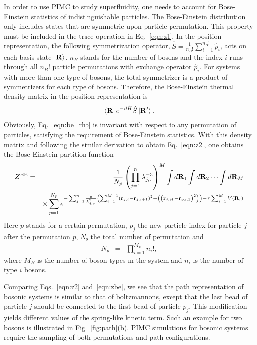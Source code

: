 \documentclass[12pt]{iopart}
\begin{document}
In order to use PIMC to study superfluidity, one needs to account for Bose-Einstein statistics of indistinguishable particles. 
The Bose-Einstein distribution only includes states that are symmetric upon particle permutation.
This property must be included in the trace operation in Eq.~\ref{eqn:z1}. 
In the position representation, the following symmetrization operator, $\hat{S}=\frac{1}{n_{B}!}\sum_{i=1}^{n_{B}!}\hat{p}_i$, acts on
each basis state $\left|{\bf R} \right>$. 
$n_{B}$ stands for the number of bosons and the index $i$ runs through all $n_B!$ particle permutations with exchange operator
$\hat{p}_i$. 
For systems with more than one type of bosons, 
the total symmetrizer is a product of symmetrizers for each type of bosons. 
Therefore, the Bose-Einstein thermal density matrix in the position representation is
\begin{eqnarray}
\left< {\bf R} \right| e^{ -\beta\hat{H} }\hat{S}\left| {\bf R'}\right>. \label{eqn:be_rho}
\end{eqnarray}
Obviously, Eq.~\ref{eqn:be_rho} is invariant with respect to any permutation of particles, satisfying the requirement of Bose-Einstein statistics. With this density matrix and following the similar derivation to obtain Eq.~\ref{eqn:z2}, one obtains the Bose-Einstein partition function
\begin{eqnarray}
Z^{\rm BE}&=&\frac{1}{N_{p}}\left(\prod_{j=1}^n \lambda_{j,\tau}^{-3} \right)^M \int d {\bf R}_1\int d {\bf R}_2\cdots\int d {\bf R}_M \nonumber\\
&&\times \sum_{p=1}^{N_p} e^{ -\sum_{j=1}^n \frac{\pi}{\lambda_{j,\tau}^2} \left( \sum_{i=1}^{M-1}  \left( {\bf r}_{j,i}- {\bf r}_{j,i+1}\right)^2 + \left( \left( {\bf r}_{j,M}- {\bf r}_{p_j,1}\right)^2 \right) \right) -\tau \sum_{i=1}^MV\left( {\bf R}_i \right)}  \label{eqn:zbe}
\end{eqnarray}
Here $p$ stands for a certain permutation, $p_j$ the new particle index for particle $j$ after the permutation $p$, $N_p$ the total number of permutation and
\begin{eqnarray}
N_p&=&\prod_{i=1}^{M_B} n_i!,
\end{eqnarray}
where $M_B$ is the number of boson types in the system and $n_i$ is the number of type $i$ bosons.

Comparing Eqs.~\ref{eqn:z2} and~\ref{eqn:zbe}, we see that the path representation of bosonic systems is similar to that of boltzmannons, except that the last bead of particle $j$ should be connected to the first bead of particle $p_j$.
This modification yields  different values of the spring-like kinetic term. 
Such an example for two bosons is illustrated in Fig.~\ref{fig:path}(b). 
PIMC simulations for bosonic systems  require the sampling of both permutations and path configurations.
\end{document}
